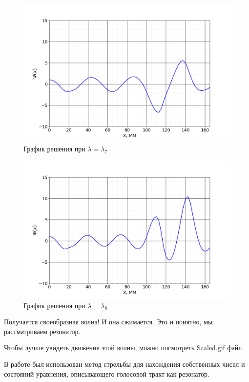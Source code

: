 		
		\newpage			
		\begin{figure}[h!]
			\centering
			\includegraphics[width=0.92\linewidth]{Pictures/Scaled/7_Scaled.png}
			\caption{График решения при $\lambda = \lambda_7$}
		\end{figure}
		
		

		\begin{figure}[h!]
			\centering
			\includegraphics[width=0.92\linewidth]{Pictures/Scaled/8_Scaled.png}
			\caption{График решения при $\lambda = \lambda_8$}
		\end{figure}
		
		Получается своеобразная волна! И она сжимается. Это и понятно, мы рассматриваем резонатор.

		Чтобы лучше увидеть движение этой волны, можно посмотреть Scaled.gif файл.

	
		
		В работе был использован метод стрельбы для нахождения собственных чисел и состояний уравнения, описывающего голосовой тракт как резонатор.
		
		
